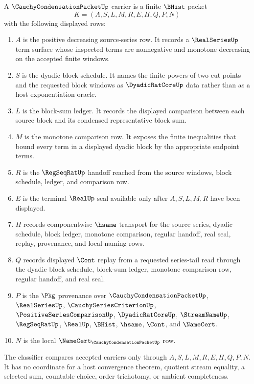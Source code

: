 \begin{definition}
\label{def:cauchy-condensation-packet-carrier}
A $\CauchyCondensationPacketUp$ carrier is a finite $\BHist$ packet
$$
K=(A,S,L,M,R,E,H,Q,P,N)
$$
with the following displayed rows:
\begin{enumerate}
\item $A$ is the positive decreasing source-series row. It records a $\RealSeriesUp$ term surface whose inspected terms are nonnegative and monotone decreasing on the accepted finite windows.
\item $S$ is the dyadic block schedule. It names the finite powers-of-two cut points and the requested block windows as $\DyadicRatCoreUp$ data rather than as a host exponentiation oracle.
\item $L$ is the block-sum ledger. It records the displayed comparison between each source block and its condensed representative block sum.
\item $M$ is the monotone comparison row. It exposes the finite inequalities that bound every term in a displayed dyadic block by the appropriate endpoint terms.
\item $R$ is the $\RegSeqRatUp$ handoff reached from the source windows, block schedule, ledger, and comparison row.
\item $E$ is the terminal $\RealUp$ seal available only after $A,S,L,M,R$ have been displayed.
\item $H$ records componentwise $\hsame$ transport for the source series, dyadic schedule, block ledger, monotone comparison, regular handoff, real seal, replay, provenance, and local naming rows.
\item $Q$ records displayed $\Cont$ replay from a requested series-tail read through the dyadic block schedule, block-sum ledger, monotone comparison row, regular handoff, and real seal.
\item $P$ is the $\Pkg$ provenance over $\CauchyCondensationPacketUp$, $\RealSeriesUp$, $\CauchySeriesCriterionUp$, $\PositiveSeriesComparisonUp$, $\DyadicRatCoreUp$, $\StreamNameUp$, $\RegSeqRatUp$, $\RealUp$, $\BHist$, $\hsame$, $\Cont$, and $\NameCert$.
\item $N$ is the local $\NameCert_{\CauchyCondensationPacketUp}$ row.
\end{enumerate}
The classifier compares accepted carriers only through $A,S,L,M,R,E,H,Q,P,N$. It has no coordinate for a host convergence theorem, quotient stream equality, a selected sum, countable choice, order trichotomy, or ambient completeness.
\end{definition}

